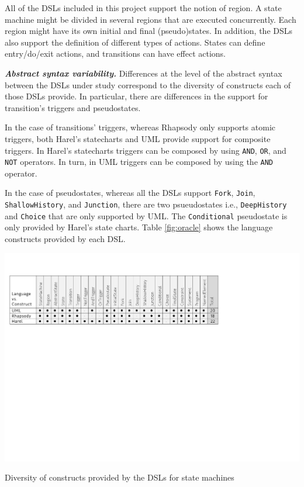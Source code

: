 \documentclass[preprint,5p]{elsarticle}
\begin{document}
All of the DSLs included in this project support the notion of region. A state machine might be divided in several regions that are executed concurrently. Each region might have its own initial and final (pseudo)states. In addition, the DSLs also support the definition of different types of actions. States can define entry/do/exit actions, and transitions can have effect actions.

\vspace{2mm}
\textit{\textbf{Abstract syntax variability.}} Differences at the level of the abstract syntax between the DSLs under study correspond to the diversity of constructs each of those DSLs provide. In particular, there are differences in the support for transition's triggers and pseudostates.

In the case of transitions' triggers, whereas Rhapsody only supports atomic triggers, both Harel's statecharts and UML provide support for composite triggers. In Harel's statecharts triggers can be composed by using \texttt{AND}, \texttt{OR}, and \texttt{NOT} operators. In turn, in UML triggers can be composed by using the \texttt{AND} operator.

In the case of pseudostates, whereas all the DSLs support \texttt{Fork}, \texttt{Join}, \texttt{ShallowHistory}, and \texttt{Junction}, there are two psueudostates i.e., \texttt{DeepHistory} and \texttt{Choice} that are only supported by UML. The \texttt{Conditional} pseudostate is only provided by Harel's state charts. Table \ref{fig:oracle} shows the language constructs provided by each DSL.

\begin{table}[t]
	\centering
	\includegraphics[width=1\linewidth]{images/tab-oracle-statemachines}
	\caption{Diversity of constructs provided by the DSLs for state machines}
	\label{fig:oracle}
\end{table}
\end{document}
